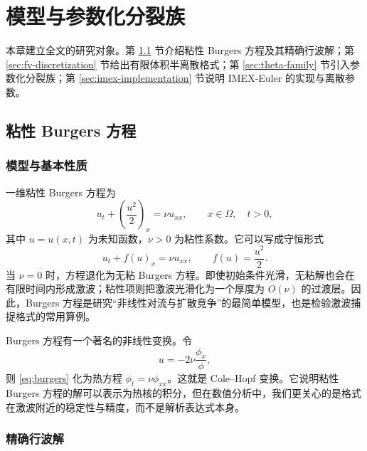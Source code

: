\chapter{模型与参数化分裂族}

本章建立全文的研究对象。第 \ref{sec:burgers-model} 节介绍粘性 Burgers 方程及其精确行波解；第 \ref{sec:fv-discretization} 节给出有限体积半离散格式；第 \ref{sec:theta-family} 节引入参数化分裂族；第 \ref{sec:imex-implementation} 节说明 IMEX-Euler 的实现与离散参数。

\section{粘性 Burgers 方程}
\label{sec:burgers-model}

\subsection{模型与基本性质}

一维粘性 Burgers 方程为
\begin{equation}
  u_t+\left(\frac{u^2}{2}\right)_x=\nu u_{xx},
  \qquad x\in\Omega,\quad t>0,
  \label{eq:burgers}
\end{equation}
其中 $u=u(x,t)$ 为未知函数，$\nu>0$ 为粘性系数。它可以写成守恒形式
\begin{equation}
  u_t+f(u)_x=\nu u_{xx},\qquad f(u)=\frac{u^2}{2}.
  \label{eq:burgers-conservation}
\end{equation}
当 $\nu=0$ 时，方程退化为无粘 Burgers 方程。即使初始条件光滑，无粘解也会在有限时间内形成激波；粘性项则把激波光滑化为一个厚度为 $O(\nu)$ 的过渡层。因此，Burgers 方程是研究“非线性对流与扩散竞争”的最简单模型，也是检验激波捕捉格式的常用算例。

Burgers 方程有一个著名的非线性变换。令
\begin{equation}
  u=-2\nu\frac{\phi_x}{\phi},
  \label{eq:cole-hopf}
\end{equation}
则 \eqref{eq:burgers} 化为热方程 $\phi_t=\nu\phi_{xx}$。这就是 Cole--Hopf 变换。它说明粘性 Burgers 方程的解可以表示为热核的积分，但在数值分析中，我们更关心的是格式在激波附近的稳定性与精度，而不是解析表达式本身。

\subsection{精确行波解}

